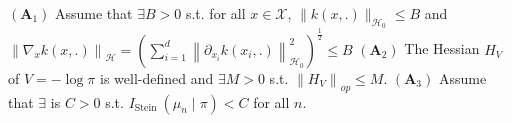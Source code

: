 \documentclass[12pt,a4paper]{article}
\begin{document}
	$\left(\mathbf{A}_{1}\right)$ Assume that $\exists B>0$ s.t. for all $x \in \mathcal{X}$,
	$\|k(x, .)\|_{\mathcal{H}_{0}} \leq B$ and $\left\|\nabla_{x} k(x, .)\right\|_{\mathcal{H}}=\left(\sum_{i=1}^{d}\left\|\partial_{x_{i}} k\left(x_{i}, .\right)\right\|_{\mathcal{H}_{0}}^{2}\right)^{\frac{1}{2}} \leq B$
	$\left(\mathbf{A}_{2}\right)$ The Hessian $H_{V}$ of $V=-\log \pi$ is well-defined and $\exists M>0$ s.t. $\left\|H_{V}\right\|_{o p} \leq M$.
	$\left(\mathbf{A}_{3}\right)$ Assume that $\exists$ is $C>0$ s.t. $I_{\text {Stein }}\left(\mu_{n} \mid \pi\right)<C$ for all $n$.
\end{document}
